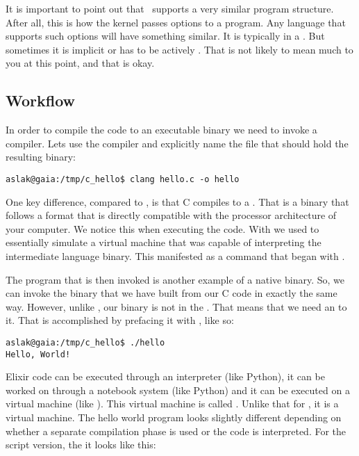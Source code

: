 It is important to point out that \csharp\ supports a very similar program structure. After all, this is how the kernel passes options to a program. Any language that supports such options will have something similar. It is typically in a . But sometimes it is implicit or has to be actively . That is not likely to mean much to you at this point, and that is okay.

\subsection{Workflow}

In order to compile the code to an executable binary we need to invoke a compiler. Lets use the  compiler and explicitly name the file that should hold the resulting binary:

\begin{verbatim}
aslak@gaia:/tmp/c_hello$ clang hello.c -o hello
\end{verbatim}

One key difference, compared to \csharp, is that C compiles to a . That is a binary that follows a format that is directly compatible with the processor architecture of your computer. We notice this when executing the code. With \csharp we used  to essentially simulate a virtual machine that was capable of interpreting the intermediate language binary. This manifested as a command that began with .

The  program that is then invoked is another example of a native binary. So, we can invoke the binary that we have built from our C code in exactly the same way. However, unlike , our binary is not in the . That means that we need an  to it. That is accomplished by prefacing it with , like so:

\begin{verbatim}
aslak@gaia:/tmp/c_hello$ ./hello
Hello, World!
\end{verbatim}


Elixir code can be executed through an interpreter (like Python), it can be worked on through a notebook system (like Python) and it can be executed on a virtual machine (like \csharp). This virtual machine is called . Unlike that for \csharp, it is a  virtual machine. The hello world program looks slightly different depending on whether a separate compilation phase is used or the code is interpreted. For the script version, the it looks like this:

